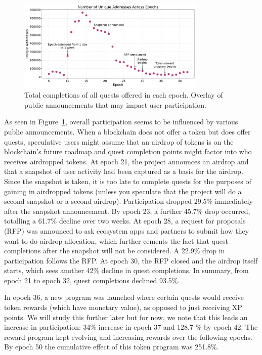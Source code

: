 \begin{figure}[t]
    \centering
    \includegraphics[width=0.8\textwidth]{figures/events.pdf}
    \caption{Total completions of all quests offered in each epoch. Overlay of public announcements that may impact user participation.}
    \label{fig:events}
\end{figure}

As seen in  Figure~\ref{fig:events}, overall participation seems to be influenced by various public announcements. When a blockchain does not offer a token but does offer quests, speculative users might assume that an airdrop of tokens is on the blockchain's future roadmap and quest completion points might factor into who receives airdropped tokens. At epoch 21, the project announces an airdrop and that a snapshot of user activity had been captured as a basis for the airdrop. Since the snapshot is taken, it is too late to complete quests for the purposes of gaining in airdropped tokens (unless you speculate that the project will do a second snapshot or a second airdrop). Participation dropped 29.5\% immediately after the snapshot announcement. By epoch 23, a further 45.7\% drop occurred, totalling a 61.7\% decline over two weeks. At epoch 28, a request for proposals (RFP) was announced to ask ecosystem apps and partners to submit how they want to do airdrop allocation, which further cements the fact that quest completions after the snapshot will not be considered. A 22.9\% drop in participation follows the RFP. At epoch 30, the RFP closed and the airdrop itself starts, which sees another 42\% decline in quest completions. In summary, from epoch 21 to epoch 32, quest completions declined 93.5\%.  

In epoch 36, a new program was launched where certain quests would receive token rewards (which have monetary value), as opposed to just receiving XP points. We will study this further later but for now, we note that this leads an increase in participation: 34\% increase in epoch 37 and 128.7 \% by epoch 42. The reward program kept evolving and increasing rewards over the following epochs. By epoch 50 the cumulative effect of this token program was 251.8\%.

